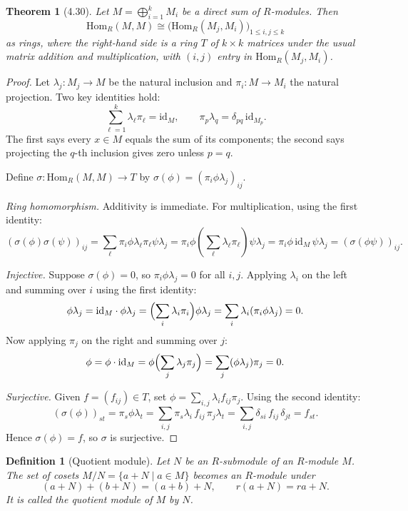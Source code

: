 \documentclass[12pt]{article}
\newtheorem{theorem}{Theorem}
\newtheorem{definition}{Definition}
\begin{document}
\begin{theorem}[4.30]
Let $M = \bigoplus_{i=1}^k M_i$ be a direct sum of $R$-modules. Then
\[
  \mathrm{Hom}_R(M,M) \cong \bigl(\mathrm{Hom}_R(M_j,M_i)\bigr)_{1 \leq i,j \leq k}
\]
as rings, where the right-hand side is a ring $T$ of $k \times k$ matrices under the usual matrix addition and multiplication, with $(i,j)$ entry in $\mathrm{Hom}_R(M_j,M_i)$.
\end{theorem}

\begin{proof}
Let $\lambda_j : M_j \to M$ be the natural inclusion and $\pi_i : M \to M_i$ the natural projection. Two key identities hold:
\[
  \sum_{\ell=1}^k \lambda_\ell\pi_\ell = \mathrm{id}_M, \qquad \pi_p\lambda_q = \delta_{pq}\,\mathrm{id}_{M_p}.
\]
The first says every $x \in M$ equals the sum of its components; the second says projecting the $q$-th inclusion gives zero unless $p = q$.

Define $\sigma : \mathrm{Hom}_R(M,M) \to T$ by $\sigma(\phi) = (\pi_i\phi\lambda_j)_{ij}$.

\textit{Ring homomorphism.} Additivity is immediate. For multiplication, using the first identity:
\[
  (\sigma(\phi)\sigma(\psi))_{ij} = \sum_\ell \pi_i\phi\lambda_\ell\pi_\ell\psi\lambda_j = \pi_i\phi\!\left(\sum_\ell\lambda_\ell\pi_\ell\right)\!\psi\lambda_j = \pi_i\phi\,\mathrm{id}_M\,\psi\lambda_j = (\sigma(\phi\psi))_{ij}.
\]

\textit{Injective.} Suppose $\sigma(\phi) = 0$, so $\pi_i\phi\lambda_j = 0$ for all $i,j$. Applying $\lambda_i$ on the left and summing over $i$ using the first identity:
\[
  \phi\lambda_j = \mathrm{id}_M\cdot\phi\lambda_j = \Bigl(\sum_i\lambda_i\pi_i\Bigr)\phi\lambda_j = \sum_i \lambda_i(\pi_i\phi\lambda_j) = 0.
\]
Now applying $\pi_j$ on the right and summing over $j$:
\[
  \phi = \phi\cdot\mathrm{id}_M = \phi\Bigl(\sum_j\lambda_j\pi_j\Bigr) = \sum_j(\phi\lambda_j)\pi_j = 0.
\]

\textit{Surjective.} Given $f = (f_{ij}) \in T$, set $\phi = \sum_{i,j}\lambda_i f_{ij}\pi_j$. Using the second identity:
\[
  (\sigma(\phi))_{st} = \pi_s\phi\lambda_t = \sum_{i,j}\pi_s\lambda_i\,f_{ij}\,\pi_j\lambda_t = \sum_{i,j}\delta_{si}\,f_{ij}\,\delta_{jt} = f_{st}.
\]
Hence $\sigma(\phi) = f$, so $\sigma$ is surjective.
\end{proof}


\begin{definition}[Quotient module]
Let $N$ be an $R$-submodule of an $R$-module $M$. The set of cosets $M/N = \{a + N \mid a \in M\}$ becomes an $R$-module under
\[
  (a + N) + (b + N) = (a + b) + N, \qquad r(a + N) = ra + N.
\]
It is called the \emph{quotient module} of $M$ by $N$.
\end{definition}
\end{document}
